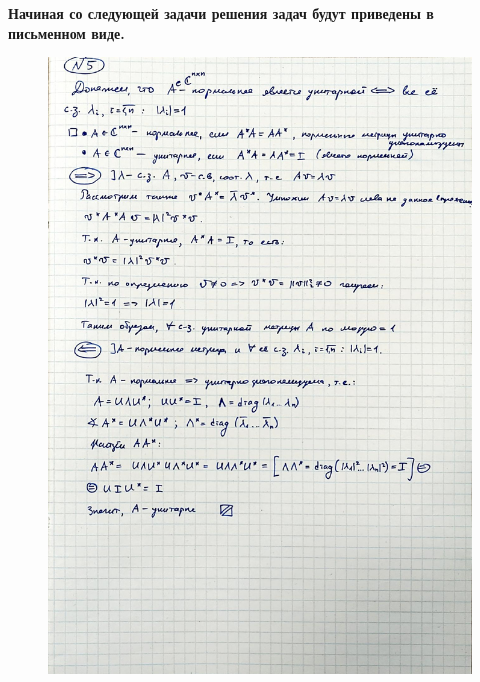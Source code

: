 \documentclass{article}
\begin{document}
		\textbf{Начиная со следующей задачи решения задач будут приведены в письменном виде.}

		\begin{figure}[h!]
			\includegraphics[width=0.95\linewidth]{handwritten/matcomp_hw1_5}
		\end{figure}
		
\end{document}
